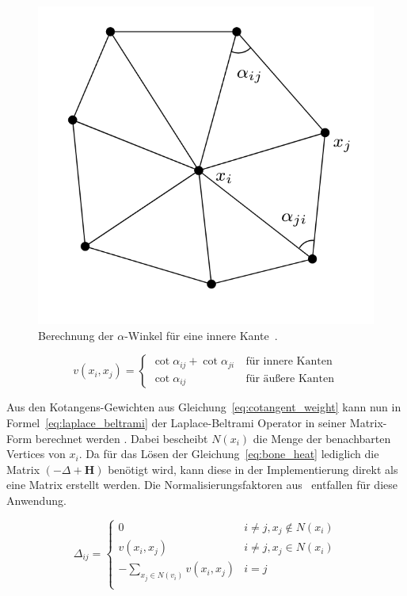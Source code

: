 \begin{figure}[h!]
	\centering
	\includegraphics[width=0.4\linewidth]{resources/img/cotangent_approx.png}
	\caption{Berechnung der $\alpha$-Winkel für eine innere Kante~\cite{laplace_beltrami_paper}.}
	\label{fig:cotangent_approx}
\end{figure}

\begin{equation}
	\label{eq:cotangent_weight}
	v(x_i,x_j) =
	\begin{cases}
		\cot{\alpha_{ij}}+\cot{\alpha_{ji}}\  & \text{für innere Kanten} \\
		\cot{\alpha_{ij}}                     & \text{für äußere Kanten}
	\end{cases}
\end{equation}

Aus den Kotangens-Gewichten aus Gleichung~\ref{eq:cotangent_weight} kann nun in Formel~\ref{eq:laplace_beltrami} der Laplace-Beltrami Operator in seiner Matrix-Form berechnet werden \cite{spd_solver_paper,laplace_beltrami_paper}. Dabei bescheibt $N(x_i)$ die Menge der benachbarten Vertices von $x_i$. Da für das Lösen der Gleichung~\ref{eq:bone_heat} lediglich die Matrix $(-\Delta+\textbf{H})$ benötigt wird, kann diese in der Implementierung direkt als eine Matrix erstellt werden. Die Normalisierungsfaktoren aus~\cite{spd_solver_paper} entfallen für diese Anwendung.

\begin{equation}
	\label{eq:laplace_beltrami}
	\Delta_{ij}=
	\begin{cases}
		0                                & i \neq j, x_j \notin N(x_i) \\
		v(x_i,x_j)                       & i \neq j, x_j \in N(x_i)    \\
		-\sum_{x_j\in N(v_i)} v(x_i,x_j) & i = j                       \\
	\end{cases}
\end{equation}

